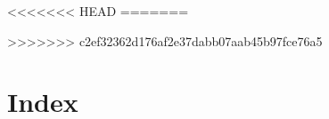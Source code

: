 \documentclass[11pt,a4paper,openany]{book}
\begin{document}
	
	
	
	
	\pagestyle{plain}
	
	
	
	
	\tableofcontents
	
	
	
	
	
	\mainmatter
	
	
	
	
	
	
	
	
	
	
	
<<<<<<< HEAD
%	
%	
%	
%	
%	
=======
	
	
	
	
	
	
	
>>>>>>> c2ef32362d176af2e37dabb07aab45b97fce76a5
	
	
	
	\newpage
	\chapter*{Index}
	\printindex[name]
	\printindex[title]
	
	\printbibliography
	
\end{document}
